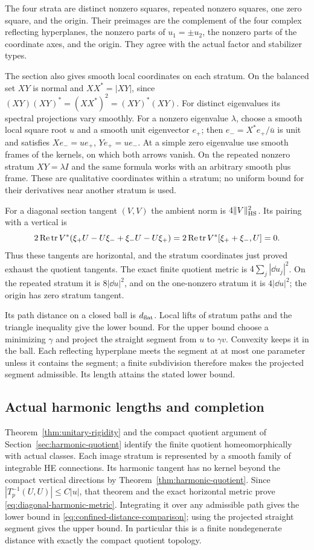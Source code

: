 The four strata are distinct nonzero squares, repeated
nonzero squares, one zero square, and the origin.
Their preimages are the complement of the four complex
reflecting hyperplanes, the nonzero parts of $u_1=\pm u_2$,
the nonzero parts of the coordinate axes, and the origin.
They agree with the actual factor and stabilizer types.

The section also gives smooth local coordinates on each
stratum. On the balanced set $XY$ is normal and
$XX^*=|XY|$, since
$(XY)(XY)^*=(XX^*)^2=(XY)^*(XY)$.
For distinct eigenvalues its spectral projections vary
smoothly. For a nonzero eigenvalue $\lambda$, choose a
smooth local square root $u$ and a smooth unit eigenvector
$e_+$; then $e_-=X^*e_+/\bar u$ is unit and satisfies
$Xe_-=ue_+$, $Ye_+=ue_-$.
At a simple zero eigenvalue use smooth frames of the
kernels, on which both arrows vanish. On the repeated
nonzero stratum $XY=\lambda I$ and the same formula
works with an arbitrary smooth plus frame. These are
qualitative coordinates within a stratum; no uniform
bound for their derivatives near another stratum is used.

For a diagonal section tangent $(V,V)$ the ambient norm
is $4\|V\|_{\rm HS}^2$. Its pairing with a vertical is
\[
 2\operatorname{Re}\operatorname{tr}
       V^*(\xi_+U-U\xi_-+\xi_-U-U\xi_+)
   =2\operatorname{Re}\operatorname{tr} V^*[\xi_++\xi_-,U]=0.
\]
Thus these tangents are horizontal, and the stratum
coordinates just proved exhaust the quotient tangents.
The exact finite quotient metric is $4\sum_j|\dd u_j|^2$.
On the repeated stratum it is $8|\dd u|^2$, and on
the one-nonzero stratum it is $4|\dd u|^2$; the origin
has zero stratum tangent.

Its path distance on a closed ball is $d_{\rm flat}$.
Local lifts of stratum paths and the triangle inequality
give the lower bound. For the upper bound choose a
minimizing $\gamma$ and project the straight segment
from $u$ to $\gamma v$. Convexity keeps it in the ball.
Each reflecting hyperplane meets the segment at at most
one parameter unless it contains the segment; a finite
subdivision therefore makes the projected segment
admissible. Its length attains the stated lower bound.

\subsection{Actual harmonic lengths and completion}

Theorem~\ref{thm:unitary-rigidity} and the compact quotient
argument of Section~\ref{sec:harmonic-quotient} identify
the finite quotient homeomorphically with actual classes.
Each image stratum is represented by a smooth family
of integrable HE connections. Its harmonic tangent
has no kernel beyond the compact vertical directions
by Theorem~\ref{thm:harmonic-quotient}.
Since $|T_p^{-1}(U,U)|\le C|u|$, that theorem and the
exact horizontal metric prove
\eqref{eq:diagonal-harmonic-metric}.
Integrating it over any admissible path gives the lower
bound in \eqref{eq:confined-distance-comparison}; using
the projected straight segment gives the upper bound.
In particular this is a finite nondegenerate distance
with exactly the compact quotient topology.

